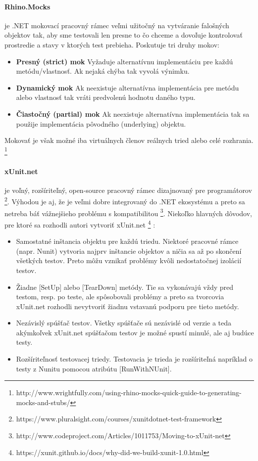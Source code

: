 \documentclass[11pt,twoside,slovak,a4paper]{article}
\begin{document}
		\paragraph{Rhino.Mocks} je .NET mokovací pracovný rámec veľmi užitočný na vytváranie falošných objektov tak, aby sme testovali len presne to čo chceme a dovoľuje kontrolovať prostredie a stavy v ktorých test prebieha.
		Poskutuje tri druhy mokov:
		\begin{itemize}
			\item \textbf{Presný (strict) mok} Vyžaduje alternatívnu implementáciu pre každú metódu/vlastnosť. Ak nejaká chýba tak vyvolá výnimku.
			\item \textbf{Dynamický mok} Ak neexistuje alternatívna implementácia pre metódu alebo vlastnosť tak vráti predvolenú hodnotu daného typu.
			\item \textbf{Čiastočný (partial) mok} Ak neexistuje alternatívna implementácia tak sa použije implementácia pôvodného (underlying) objektu.
		\end{itemize}
		Mokovať je však možné iba virtuálnych členov reálnych tried alebo celé rozhrania. \footnote{http://www.wrightfully.com/using-rhino-mocks-quick-guide-to-generating-mocks-and-stubs/}
		
		\paragraph{xUnit.net} je voľný, rozšíriteľný, open-source pracovný rámec dizajnovaný pre programátorov \footnote{https://www.pluralsight.com/courses/xunitdotnet-test-framework}.
		Výhodou je aj, že je veľmi dobre integrovaný do .NET ekosystému a preto sa netreba báť vážnejšieho problému s kompatibilitou \footnote{http://www.codeproject.com/Articles/1011753/Moving-to-xUnit-net}.
		Niekoľko hlavných dôvodov, pre ktoré sa rozhodli autori vytvoriť xUnit.net \footnote{https://xunit.github.io/docs/why-did-we-build-xunit-1.0.html} :
		\begin{itemize}
			\item Samostatné inštancia objektu pre každú triedu. Niektoré pracovné rámce (napr. Nunit) vytvoria najprv inštancie objektov a ničia sa až po skončení všetkých testov. Preto môžu vznikať problémy kvôli nedostatočnej izolácií testov.
			\item Žiadne [SetUp] alebo [TearDown] metódy. Tie sa vykonávajú vždy pred testom, resp. po teste, ale spôsobovali problémy a preto sa tvorcovia xUnit.net rozhodli nevytvoriť žiadnu vstavanú podporu pre tieto metódy.
			\item Nezávislý spúšťač testov. Všetky spúšťače sú nezávislé od verzie a teda akýmkoľvek xUnit.net spúšťačom testov je možné spustí minulé, ale aj budúce testy.
			\item Rozšíriteľnosť testovacej triedy. Testovacia je trieda je rozšíriteľná napríklad o testy z Nunitu pomocou atribútu [RunWithNUnit].
		\end{itemize}
		
\end{document}
